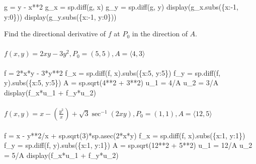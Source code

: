 \documentclass[
  letterpaper,
  DIV=11,
  numbers=noendperiod]{scrartcl}
\let\oldparagraph\paragraph
\renewcommand{\paragraph}[1]{\oldparagraph{#1}\mbox{}}
\newenvironment{Shaded}{\begin{snugshade}}{\end{snugshade}}
\newcommand{\NormalTok}[1]{\textcolor[rgb]{0.00,0.23,0.31}{#1}}
\begin{document}
\begin{Shaded}
\begin{Highlighting}[numbers=left,,]
\NormalTok{g = y {-} x**2}
\NormalTok{g\_x = sp.diff(g, x)}
\NormalTok{g\_y = sp.diff(g, y)}
\NormalTok{display(g\_x.subs(\{x:{-}1, y:0\}))}
\NormalTok{display(g\_y.subs(\{x:{-}1, y:0\}))}
\end{Highlighting}
\end{Shaded}

Find the directional derivative of \(f\) at \(P_0\) in the direction of
\(A\).

\paragraph{\texorpdfstring{\(f(x, y) = 2xy - 3y^2, P_0 = (5, 5), A = \langle 4, 3 \rangle\)}{f(x, y) = 2xy - 3y\^{}2, P\_0 = (5, 5), A = \textbackslash langle 4, 3 \textbackslash rangle}}\label{fx-y-2xy---3y2-p_0-5-5-a-langle-4-3-rangle}

\begin{Shaded}
\begin{Highlighting}[numbers=left,,]
\NormalTok{f = 2*x*y {-} 3*y**2}
\NormalTok{f\_x = sp.diff(f, x).subs(\{x:5, y:5\})}
\NormalTok{f\_y = sp.diff(f, y).subs(\{x:5, y:5\})}
\NormalTok{A = sp.sqrt(4**2 + 3**2)}
\NormalTok{u\_1 = 4/A}
\NormalTok{u\_2 = 3/A}
\NormalTok{display(f\_x*u\_1 + f\_y*u\_2)}
\end{Highlighting}
\end{Shaded}

\paragraph{\texorpdfstring{\(f(x, y) = x- \left(\frac{y^2}{x}\right) + \sqrt{3}\sec^{-1}(2xy), P_0 = (1, 1), A = \langle 12, 5 \rangle\)}{f(x, y) = x- \textbackslash left(\textbackslash frac\{y\^{}2\}\{x\}\textbackslash right) + \textbackslash sqrt\{3\}\textbackslash sec\^{}\{-1\}(2xy), P\_0 = (1, 1), A = \textbackslash langle 12, 5 \textbackslash rangle}}\label{fx-y-x--leftfracy2xright-sqrt3sec-12xy-p_0-1-1-a-langle-12-5-rangle}

\begin{Shaded}
\begin{Highlighting}[numbers=left,,]
\NormalTok{f = x {-} y**2/x + sp.sqrt(3)*sp.asec(2*x*y)}
\NormalTok{f\_x = sp.diff(f, x).subs(\{x:1, y:1\})}
\NormalTok{f\_y = sp.diff(f, y).subs(\{x:1, y:1\})}
\NormalTok{A = sp.sqrt(12**2 + 5**2)}
\NormalTok{u\_1 = 12/A}
\NormalTok{u\_2 = 5/A}
\NormalTok{display(f\_x*u\_1 + f\_y*u\_2)}
\end{Highlighting}
\end{Shaded}
\end{document}

